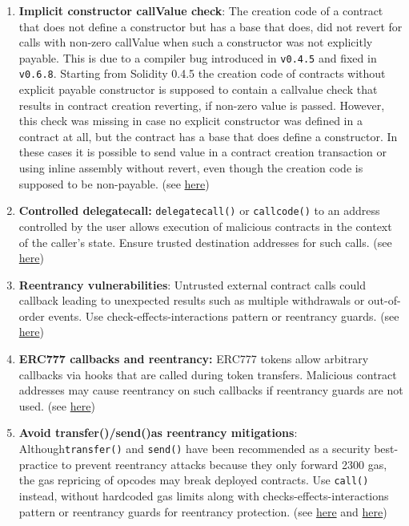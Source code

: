 \begin{enumerate}
\item\textbf{Implicit constructor callValue check}: The creation code of a contract that does not define a constructor but has a base that does, did not revert for calls with non-zero callValue when such a constructor was not explicitly payable. This is due to a compiler bug introduced in \verb|v0.4.5| and fixed in \verb|v0.6.8|. Starting from Solidity 0.4.5 the creation code of contracts without explicit payable constructor is supposed to contain a callvalue check that results in contract creation reverting, if non-zero value is passed. However, this check was missing in case no explicit constructor was defined in a contract at all, but the contract has a base that does define a constructor. In these cases it is possible to send value in a contract creation transaction or using inline assembly without revert, even though the creation code is supposed to be non-payable. (see \href{https://docs.soliditylang.org/en/v0.8.9/bugs.html}{here})

\item\textbf{Controlled delegatecall: }\verb|delegatecall()| or \verb|callcode()| to an address controlled by the user allows execution of malicious contracts in the context of the caller’s state. Ensure trusted destination addresses for such calls. (see \href{https://swcregistry.io/docs/SWC-112}{here})

\item\textbf{Reentrancy vulnerabilities}: Untrusted external contract calls could callback leading to unexpected results such as multiple withdrawals or out-of-order events. Use check-effects-interactions pattern or reentrancy guards. (see \href{https://swcregistry.io/docs/SWC-107}{here})

\item\textbf{ERC777 callbacks and reentrancy: }ERC777 tokens allow arbitrary callbacks via hooks that are called during token transfers. Malicious contract addresses may cause reentrancy on such callbacks if reentrancy guards are not used. (see \href{https://quantstamp.com/blog/how-the-dforce-hacker-used-reentrancy-to-steal-25-million}{here})

\item\textbf{Avoid transfer()/send()as reentrancy mitigations}: Although\linebreak\verb|transfer()| and \verb|send()| have been recommended as a security best-practice to prevent reentrancy attacks because they only forward 2300 gas, the gas repricing of opcodes may break deployed contracts. Use \verb|call()| instead, without hardcoded gas limits along with checks-effects-interactions pattern or reentrancy guards for reentrancy protection. (see \href{https://consensys.net/diligence/blog/2019/09/stop-using-soliditys-transfer-now/}{here} and \href{https://swcregistry.io/docs/SWC-134}{here})


\end{enumerate}
